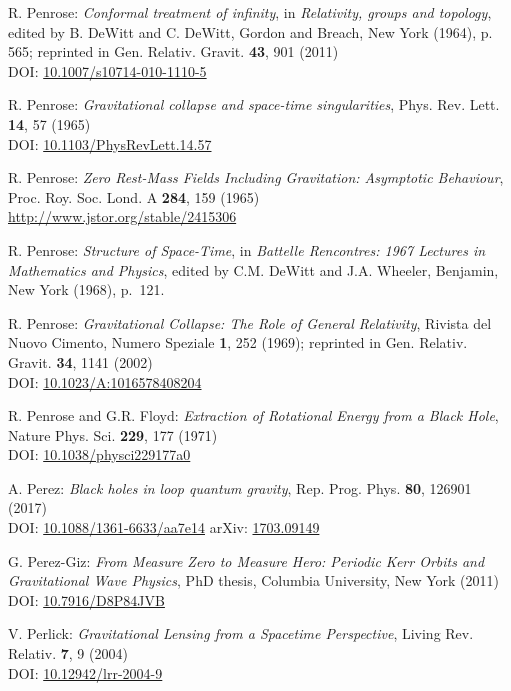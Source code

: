 \begin{thebibliography}{123}
R. Penrose: {\em Conformal treatment of infinity}, in {\em Relativity, groups and topology},
edited by B. DeWitt and C. DeWitt,
Gordon and Breach, New York (1964), p. 565; reprinted in
Gen. Relativ. Gravit. {\bf 43}, 901 (2011)\\
DOI: \href{https://doi.org/10.1007/s10714-010-1110-5}{10.1007/s10714-010-1110-5}

R. Penrose: {\em Gravitational collapse and space-time singularities},
Phys. Rev. Lett. {\bf 14}, 57 (1965)\\
DOI: \href{https://doi.org/10.1103/PhysRevLett.14.57}{10.1103/PhysRevLett.14.57}

R. Penrose:
{\em Zero Rest-Mass Fields Including Gravitation: Asymptotic Behaviour},
Proc. Roy. Soc. Lond. A {\bf 284}, 159 (1965)\\
\url{http://www.jstor.org/stable/2415306}

R. Penrose: {\em Structure of Space-Time},
in {\em Battelle Rencontres: 1967 Lectures in Mathematics and Physics},
edited by C.M. DeWitt and J.A. Wheeler,
Benjamin, New York (1968), p.~121.

R. Penrose: {\em Gravitational Collapse: The Role of General Relativity},
Rivista del Nuovo Cimento, Numero Speziale {\bf 1}, 252 (1969); reprinted in
Gen. Relativ. Gravit. {\bf 34}, 1141 (2002)\\
DOI: \href{https://doi.org/10.1023/A:1016578408204}{10.1023/A:1016578408204}

R. Penrose and G.R. Floyd: {\em Extraction of Rotational Energy from
a Black Hole},  Nature Phys. Sci. {\bf 229}, 177 (1971)\\
DOI: \href{https://doi.org/10.1038/physci229177a0}{10.1038/physci229177a0}

A. Perez:
{\em Black holes in loop quantum gravity},
Rep. Prog. Phys. {\bf 80}, 126901 (2017)\\
DOI: \href{https://doi.org/10.1088/1361-6633/aa7e14}{10.1088/1361-6633/aa7e14}\hfill
arXiv: \href{https://arxiv.org/abs/1703.09149}{1703.09149}

G. Perez-Giz: {\em From Measure Zero to Measure Hero:
Periodic Kerr Orbits and Gravitational Wave Physics},
PhD thesis, Columbia University, New York (2011)\\
DOI: \href{https://doi.org/10.7916/D8P84JVB}{10.7916/D8P84JVB}

V. Perlick:
{\em Gravitational Lensing from a Spacetime Perspective},
Living Rev. Relativ. {\bf 7}, 9 (2004)\\
DOI: \href{https://doi.org/10.12942/lrr-2004-9}{10.12942/lrr-2004-9}


\end{thebibliography}
